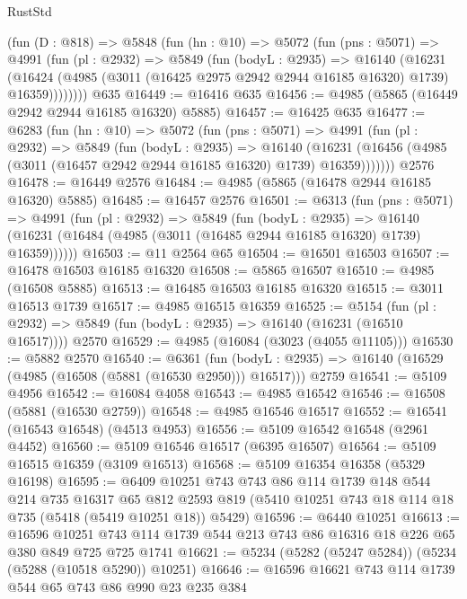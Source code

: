 \begin{lexlean}{RustStd}
\begin{coremodule}
    (fun (D : @818) =>
    @5848
      (fun (hn : @10) =>
      @5072
        (fun (pns : @5071) =>
        @4991
          (fun (pl : @2932) =>
          @5849
            (fun (bodyL : @2935) =>
            @16140
              (@16231
                (@16424 (@4985 (@3011 (@16425 @2975 @2942 @2944 @16185 @16320) @1739) @16359))))))))
    @635
@16449 := @16416 @635
@16456 := @4985 (@5865 (@16449 @2942 @2944 @16185 @16320) @5885)
@16457 := @16425 @635
@16477 := @6283
    (fun (hn : @10) =>
    @5072
      (fun (pns : @5071) =>
      @4991
        (fun (pl : @2932) =>
        @5849
          (fun (bodyL : @2935) =>
          @16140
            (@16231 (@16456 (@4985 (@3011 (@16457 @2942 @2944 @16185 @16320) @1739) @16359)))))))
    @2576
@16478 := @16449 @2576
@16484 := @4985 (@5865 (@16478 @2944 @16185 @16320) @5885)
@16485 := @16457 @2576
@16501 := @6313
    (fun (pns : @5071) =>
    @4991
      (fun (pl : @2932) =>
      @5849
        (fun (bodyL : @2935) =>
        @16140 (@16231 (@16484 (@4985 (@3011 (@16485 @2944 @16185 @16320) @1739) @16359))))))
@16503 := @11 @2564 @65
@16504 := @16501 @16503
@16507 := @16478 @16503 @16185 @16320
@16508 := @5865 @16507
@16510 := @4985 (@16508 @5885)
@16513 := @16485 @16503 @16185 @16320
@16515 := @3011 @16513 @1739
@16517 := @4985 @16515 @16359
@16525 := @5154
    (fun (pl : @2932) => @5849 (fun (bodyL : @2935) => @16140 (@16231 (@16510 @16517))))
    @2570
@16529 := @4985 (@16084 (@3023 (@4055 @11105)))
@16530 := @5882 @2570
@16540 := @6361
    (fun (bodyL : @2935) => @16140 (@16529 (@4985 (@16508 (@5881 (@16530 @2950))) @16517)))
    @2759
@16541 := @5109 @4956
@16542 := @16084 @4058
@16543 := @4985 @16542
@16546 := @16508 (@5881 (@16530 @2759))
@16548 := @4985 @16546 @16517
@16552 := @16541 (@16543 @16548) (@4513 @4953)
@16556 := @5109 @16542 @16548 (@2961 @4452)
@16560 := @5109 @16546 @16517 (@6395 @16507)
@16564 := @5109 @16515 @16359 (@3109 @16513)
@16568 := @5109 @16354 @16358 (@5329 @16198)
@16595 := @6409
    @10251
    @743
    @743
    @86
    @114
    @1739
    @148
    @544
    @214
    @735
    @16317
    @65
    @812
    @2593
    @819
    (@5410 @10251 @743 @18 @114 @18 @735 (@5418 (@5419 @10251 @18)) @5429)
@16596 := @6440 @10251
@16613 := @16596
    @10251
    @743
    @114
    @1739
    @544
    @213
    @743
    @86
    @16316
    @18
    @226
    @65
    @380
    @849
    @725
    @725
    @1741
@16621 := @5234 (@5282 (@5247 @5284)) (@5234 (@5288 (@10518 @5290)) @10251)
@16646 := @16596
    @16621
    @743
    @114
    @1739
    @544
    @65
    @743
    @86
    @990
    @23
    @235
    @384

\end{coremodule}
\end{lexlean}
